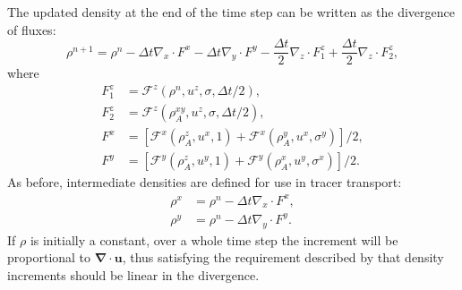 \documentclass[11pt,a4paper]{article}
\begin{document}
The updated density at the end of the time step can be written as the divergence of fluxes:
\begin{equation}
    \rho^{n+1} = \rho^n - \Delta{t}\nabla_x \cdot F^x  - \Delta{t}\nabla_y \cdot F^y  - \frac{\Delta{t}}{2}\nabla_z \cdot F_1^z + \frac{\Delta{t}}{2}\nabla_z \cdot F_2^z,
\end{equation}
where
\begin{subequations}
\begin{align}
F_1^z & = \mathcal{F}^z(\rho^n,u^z,\sigma,\Delta{t}/2), \\
F_2^z & = \mathcal{F}^z(\rho^{xy}_A,u^z,\sigma,\Delta{t}/2), \\
F^x & = \left[ \mathcal{F}^x(\rho_A^z, u^x,1) + \mathcal{F}^x(\rho^y_A, u^x, \sigma^y) \right]/2, \\
F^y & = \left[ \mathcal{F}^y(\rho_A^z, u^y,1) + \mathcal{F}^y(\rho^x_A, u^y, \sigma^x)\right]/2.
\end{align}
\end{subequations}
As before, intermediate densities are defined for use in tracer transport:
\begin{subequations}
\begin{align}
\rho^x &= \rho^{n} - \Delta{t} \nabla_x\cdot F^x, \\
\rho^y &= \rho^{n} - \Delta{t} \nabla_y\cdot F^y. 
\end{align}
\end{subequations}
If $\rho$ is initially a constant, over a whole time step the increment will be proportional to $\bm{\nabla\cdot u}$, thus satisfying the requirement described by \citet{melvin2024mixed} that density increments should be linear in the divergence.
\end{document}
